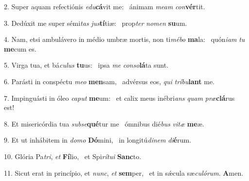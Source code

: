 2. Super aquam refectiónis \textit{e}\textit{du}\textbf{cá}vit me: \ast\  ánimam \textit{me}\textit{am} \textit{con}\textbf{vér}tit.\

3. Dedúxit me super sémi\textit{tas} \textit{jus}\textbf{tí}tiæ: \ast\  prop\textit{ter} \textit{no}\textit{men} \textbf{su}um.\

4. Nam, etsi ambulávero in médio umbræ mortis, non ti\textit{mé}\textit{bo} \textbf{ma}la: \ast\  quón\textit{i}\textit{am} \textit{tu} \textbf{me}cum es.\

5. Virga tua, et bá\textit{cu}\textit{lus} \textbf{tu}us: \ast\  ipsa \textit{me} \textit{con}\textit{so}\textbf{lá}ta sunt.\

6. Parásti in conspéctu \textit{me}\textit{o} \textbf{men}sam, \ast\  advérsus eos, \textit{qui} \textit{trí}\textit{bu}\textbf{lant} me.\

7. Impinguásti in óleo \textit{ca}\textit{put} \textbf{me}um: \ast\  et calix meus inébri\textit{ans} \textit{quam} \textit{præ}\textbf{clá}rus est!\

8. Et misericórdia tua \textit{sub}\textit{se}\textbf{qué}tur me \ast\  ómnibus dié\textit{bus} \textit{vi}\textit{tæ} \textbf{me}æ.\

9. Et ut inhábitem in \textit{do}\textit{mo} \textbf{Dó}mini, \ast\  in longitú\textit{di}\textit{nem} \textit{di}\textbf{é}rum.\

10. Glória Pa\textit{tri}, \textit{et} \textbf{Fí}lio, \ast\  et Spi\textit{rí}\textit{tu}\textit{i} \textbf{Sanc}to.\

11. Sicut erat in princípio, et \textit{nunc}, \textit{et} \textbf{sem}per, \ast\  et in sǽcula sæ\textit{cu}\textit{ló}\textit{rum}. \textbf{A}men.\

